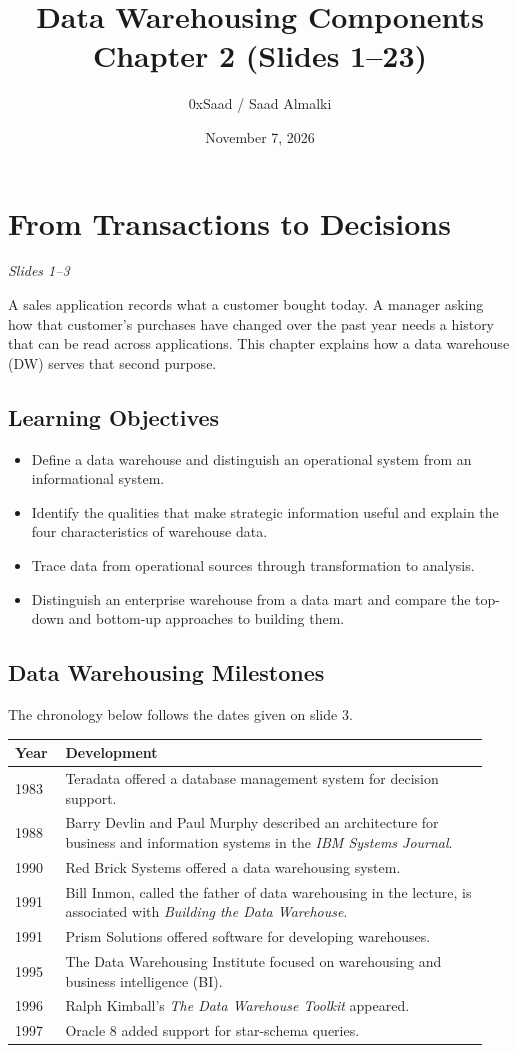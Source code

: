 \documentclass[12pt,a4paper]{article}
\title{Data Warehousing Components\\{\large Chapter 2 (Slides 1--23)}}
\author{0xSaad / Saad Almalki}
\date{November 7, 2026}
\newcommand{\slides}[1]{\textit{\small #1}\par}
\begin{document}
\maketitle
\thispagestyle{plain}
\section{From Transactions to Decisions}
\slides{Slides 1--3}
A sales application records what a customer bought today. A manager asking how that customer's purchases have changed over the past year needs a history that can be read across applications. This chapter explains how a data warehouse (DW) serves that second purpose.

\subsection{Learning Objectives}
\begin{itemize}
\item Define a data warehouse and distinguish an operational system from an informational system.
\item Identify the qualities that make strategic information useful and explain the four characteristics of warehouse data.
\item Trace data from operational sources through transformation to analysis.
\item Distinguish an enterprise warehouse from a data mart and compare the top-down and bottom-up approaches to building them.
\end{itemize}

\subsection{Data Warehousing Milestones}
The chronology below follows the dates given on slide 3.
\begin{center}\small
\begin{tabular}{@{}p{0.10\linewidth}p{0.84\linewidth}@{}}
\hline
\textbf{Year} & \textbf{Development}\\ \hline
1983 & Teradata offered a database management system for decision support.\\
1988 & Barry Devlin and Paul Murphy described an architecture for business and information systems in the \textit{IBM Systems Journal}.\\
1990 & Red Brick Systems offered a data warehousing system.\\
1991 & Bill Inmon, called the father of data warehousing in the lecture, is associated with \textit{Building the Data Warehouse}.\\
1991 & Prism Solutions offered software for developing warehouses.\\
1995 & The Data Warehousing Institute focused on warehousing and business intelligence (BI).\\
1996 & Ralph Kimball's \textit{The Data Warehouse Toolkit} appeared.\\
1997 & Oracle 8 added support for star-schema queries.\\ \hline
\end{tabular}
\end{center}
\end{document}
